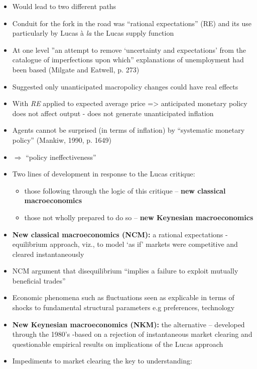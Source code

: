 \documentclass{article}
\begin{document}
\begin{itemize}
\begin{quote}
		\end{quote}
		\item Would lead to two different paths 
		\item Conduit for the fork in the road was ``rational expectations'' (RE) and its use particularly by Lucas à \textit{la} the Lucas supply function
		\item At one level ''an attempt to remove `uncertainty and expectations' from the catalogue of imperfections upon which'' explanations of unemployment had been based (Milgate and Eatwell, p. 273)
		\item Suggested only unanticipated macropolicy changes could have real effects
		\item With \textit{RE} applied to expected average price => anticipated monetary policy does not affect output - does not generate unanticipated inflation
		\item Agents cannot be surprised (in terms of inflation) by ``systematic monetary policy'' (Mankiw, 1990, p. 1649)
		\item  \( \Rightarrow \) ``policy ineffectiveness''
		\item Two lines of development in response to the Lucas critique: 
		\begin{itemize}
			\item those following through the logic of this critique -- \textbf{new classical macroeconomics}
			\item those not wholly prepared to do so -- \textbf{new Keynesian macroeconomics}
		\end{itemize}
		\item \textbf{New classical macroeconomics (NCM):} a rational expectations - equilibrium approach, viz., to model `as if' markets were competitive and cleared instantaneously
		\item NCM argument that disequilibrium ``implies a failure to exploit mutually beneficial trades''
		\item Economic phenomena such as fluctuations seen as explicable in terms of shocks to fundamental structural parameters e.g preferences, technology
		\item \textbf{New Keynesian macroeconomics (NKM):} the alternative -- developed through the 1980's -based on a rejection of instantaneous market clearing and questionable empirical results on  implications of the Lucas approach
		\item Impediments to market clearing the key to understanding:
		\begin{itemize}

\end{itemize}
\end{itemize}
\end{document}
